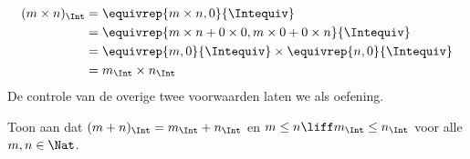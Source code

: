 \documentclass[../../../include/open-logic-section]{subfiles}
\begin{document}
	\begin{align*}
		(m \times n)_\Int  &= \equivrep{m \times n, 0}{\Intequiv} \\
		&= \equivrep{m \times n + 0 \times 0, m \times 0 + 0 \times n}{\Intequiv} \\
		&= \equivrep{m, 0}{\Intequiv} \times \equivrep{n, 0}{\Intequiv} \\
		&= m_\Int \times n_\Int
	\end{align*}
De controle van de overige twee voorwaarden laten we als oefening.
\begin{prob}
	Toon aan dat $(m + n)_\Int = m_\Int + n_\Int$ en $m \leq n \liff
	m_\Int \leq n_\Int$ voor alle $m, n \in \Nat$.
\end{prob}
\end{document}
